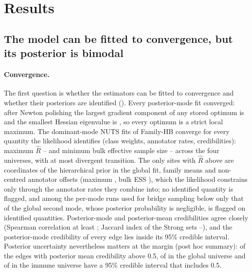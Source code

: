 \section{Results}\label{sec:results}

\subsection{The model can be fitted to convergence, but its posterior is bimodal}\label{sec:res-fit}

\paragraph{Convergence.}
The first question is whether the estimators can be fitted to convergence and whether their posteriors are identified ().
Every posterior-mode fit converged: after Newton polishing the largest gradient component of any stored optimum is \nMapGradMax{} and the smallest Hessian eigenvalue is \nMapHessMin{}, so every optimum is a strict local maximum.
The dominant-mode NUTS fits of Family-HB converge for every quantity the likelihood identifies (class weights, annotator rates, credibilities): maximum $\widehat{R}$ \nNutsRhatIdMin{}--\nNutsRhatIdMax{} and minimum bulk effective sample size \nNutsEssIdMin{}--\nNutsEssIdMax{} across the four universes, with at most \nNutsDivMax{} divergent transition.
The only sites with $\widehat{R}$ above \nRhatFlag{} are coordinates of the hierarchical prior in the global fit, family means and non-centred annotator offsets (maximum \nNutsRhatAllGlob{}, bulk ESS \nNutsEssAllGlob{}), which the likelihood constrains only through the annotator rates they combine into; no identified quantity is flagged, and among the per-mode runs used for bridge sampling below only that of the global second mode, whose posterior probability is negligible, is flagged on identified quantities.
Posterior-mode and posterior-mean credibilities agree closely (Spearman correlation at least \nMvnSpMin{}; Jaccard index of the Strong sets \nMvnJacMin{}--\nMvnJacMax{}), and the posterior-mode credibility of every edge lies inside its 95\% credible interval.
Posterior uncertainty nevertheless matters at the margin (post hoc summary): of the edges with posterior mean credibility above 0.5, \nNutsStradGlob{} of \nNutsGtHalfGlob{} in the global universe and \nNutsStradImm{} of \nNutsGtHalfImm{} in the immune universe have a 95\% credible interval that includes 0.5.


